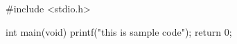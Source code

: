 \begin{Code}[caption={here is caption}]
#include <stdio.h>

int main(void) {
    printf("this is sample code\n");
    return 0;
}
\end{Code}